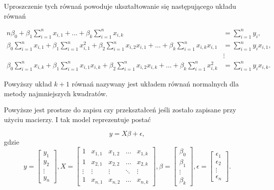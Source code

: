 \documentclass[10pt,a4paper]{book}
\begin{document}
Uproszczenie tych równań powoduje ukształtowanie się następującego układu równań 

\begin{align*}
n \beta_0 + \beta_1 \sum_{i=1}^{n} x_{i,1} + \ldots + \beta_k \sum_{i=1}^{n} x_{i,k} & = \sum_{i=1}^{n} y_i, \\
\beta_0 \sum_{i=1}^{n} x_{i,1} + \beta_1 \sum_{i=1}^{n} x_{i,1}^2 + \beta_2 \sum_{i=1}^{n} x_{i,2} x_{i,1} + \ldots + \beta_k \sum_{i=1}^{n} x_{i,k} x_{i,1} & = \sum_{i=1}^{n} y_i x_{i,1}, \\
& \vdots \\
\beta_0 \sum_{i=1}^{n} x_{i,k} + \beta_1 \sum_{i=1}^{n} x_{i,1}x_{i,k} + \beta_2 \sum_{i=1}^{n} x_{i,2} x_{i,k} + \ldots + \beta_k \sum_{i=1}^{n} x_{i,k}^2 & = \sum_{i=1}^{n} y_i x_{i,k}.
\end{align*}

Powyższy układ $k+1$ równań nazywany jest układem równań normalnych dla metody najmniejszych kwadratów.

Powyższe jest prostsze do zapisu czy przekształceń jeśli zostało zapisane przy użyciu macierzy. I tak model reprezentuje postać

\begin{equation}
y = X \beta + \epsilon,
\end{equation}
gdzie 
$$ 
y = \begin{bmatrix}
y_1\\y_2\\\vdots\\y_n
\end{bmatrix}, 
X = \begin{bmatrix}
1 & x_{1,1} & x_{1,2} & \ldots & x_{1,k} \\
1 & x_{2,1} & x_{2,2} & \ldots & x_{2,k} \\
\vdots & \vdots & \vdots & \ddots & \vdots \\
1 & x_{n,1} & x_{n,2} & \ldots & x_{n,k}
\end{bmatrix},
\beta = \begin{bmatrix}
\beta_0\\
\beta_1\\
\vdots \\
\beta_k
\end{bmatrix},
\epsilon = \begin{bmatrix}
\epsilon_1\\
\epsilon_2\\
\vdots \\
\epsilon_n
\end{bmatrix}.
$$
\end{document}
